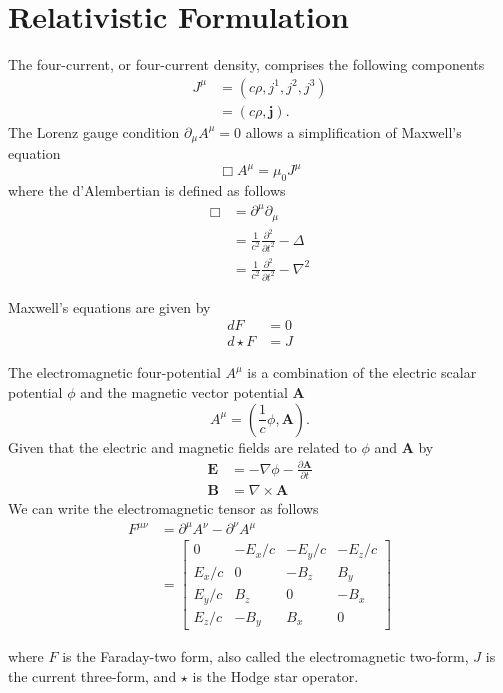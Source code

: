\documentclass{book}
\begin{document}
	\chapter{Relativistic Formulation}
	The four-current, or four-current density, comprises the following components
	\begin{align}
		J^\mu&=(c\rho,j^1,j^2,j^3)\\
		&=(c\rho,\mathbf{j})\mathrm{.}
	\end{align}
	The Lorenz gauge condition $\partial_\mu A^\mu=0$ allows a simplification of Maxwell's equation
	\begin{equation}
		\Box A^\mu=\mu_0J^\mu
	\end{equation}
	where the d'Alembertian is defined as follows
	\begin{align}
		\Box&=\partial^\mu\partial_\mu\\
		&=\frac{1}{c^2}\frac{\partial^2}{\partial t^2}-\Delta\\
		&=\frac{1}{c^2}\frac{\partial^2}{\partial t^2}-\nabla^2
	\end{align}
	
	Maxwell's equations are given by
	\begin{align}
		dF&=0\\
		d\star F&=J
	\end{align}
	
	The electromagnetic four-potential $A^\mu$ is a combination of the electric scalar potential $\phi$ and the magnetic vector potential $\mathbf{A}$
	\begin{equation}
		A^\mu=(\frac{1}{c}\phi,\mathbf{A})\mathrm{.}
	\end{equation}
	Given that the electric and magnetic fields are related to $\phi$ and $\mathbf{A}$ by
	\begin{align}
		\mathbf{E}&=-\nabla\phi-\frac{\partial\mathbf{A}}{\partial t}\\
		\mathbf{B}&=\nabla\times\mathbf{A}
	\end{align}
	We can write the electromagnetic tensor as follows
	\begin{align}
		F^{\mu\nu}&=\partial^\mu A^\nu-\partial^\nu A^\mu\\
		&=
		\begin{bmatrix}
			0 & -E_x/c & -E_y/c & -E_z/c\\
			E_x/c & 0 & -B_z & B_y\\
			E_y/c & B_z & 0 & -B_x\\
			E_z/c & -B_y & B_x & 0
		\end{bmatrix}
	\end{align}
	
	where $F$ is the Faraday-two form, also called the electromagnetic two-form, $J$ is the current three-form, and $\star$ is the Hodge star operator.
\end{document}
